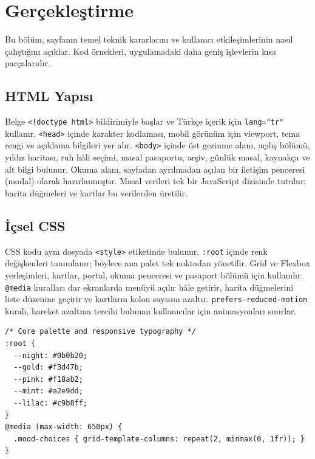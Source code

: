 \documentclass[12pt,a4paper]{article}
\begin{document}
\section{Gerçekleştirme}
Bu bölüm, sayfanın temel teknik kararlarını ve kullanıcı etkileşimlerinin nasıl çalıştığını açıklar. Kod örnekleri, uygulamadaki daha geniş işlevlerin kısa parçalarıdır.

\subsection{HTML Yapısı}
Belge \texttt{<!doctype html>} bildirimiyle başlar ve Türkçe içerik için \texttt{lang="tr"} kullanır. \texttt{<head>} içinde karakter kodlaması, mobil görünüm için viewport, tema rengi ve açıklama bilgileri yer alır. \texttt{<body>} içinde üst gezinme alanı, açılış bölümü, yıldız haritası, ruh hâli seçimi, masal pasaportu, arşiv, günlük masal, kaynakça ve alt bilgi bulunur. Okuma alanı, sayfadan ayrılmadan açılan bir iletişim penceresi (modal) olarak hazırlanmıştır. Masal verileri tek bir JavaScript dizisinde tutulur; harita düğmeleri ve kartlar bu verilerden üretilir.

\subsection{İçsel CSS}
CSS kodu aynı dosyada \texttt{<style>} etiketinde bulunur. \texttt{:root} içinde renk değişkenleri tanımlanır; böylece ana palet tek noktadan yönetilir. Grid ve Flexbox yerleşimleri, kartlar, portal, okuma penceresi ve pasaport bölümü için kullanılır. \texttt{@media} kuralları dar ekranlarda menüyü açılır hâle getirir, harita düğmelerini liste düzenine geçirir ve kartların kolon sayısını azaltır. \texttt{prefers-reduced-motion} kuralı, hareket azaltma tercihi bulunan kullanıcılar için animasyonları sınırlar.

\begin{lstlisting}[caption={İçsel CSS'ten önemli bir bölüm}]
/* Core palette and responsive typography */
:root {
  --night: #0b0b20;
  --gold: #f3d47b;
  --pink: #f18ab2;
  --mint: #a2e9dd;
  --lilac: #c9b8ff;
}
@media (max-width: 650px) {
  .mood-choices { grid-template-columns: repeat(2, minmax(0, 1fr)); }
}
\end{lstlisting}
\end{document}
